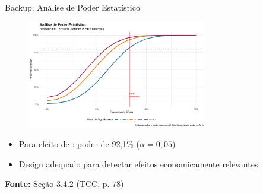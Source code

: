 \documentclass[10pt,aspectratio=169]{beamer}
\begin{document}
\begin{frame}{Backup: Análise de Poder Estatístico}
\begin{figure}
\centering
\includegraphics[width=0.7\textwidth]{../../../data/outputs/additional_figures/power_analysis_simulation.png}
\end{figure}

\begin{itemize}
    \item Para efeito de \mainattpct{}: poder de 92,1\% ($\alpha = 0,05$)
    \item Design adequado para detectar efeitos economicamente relevantes
\end{itemize}

\textbf{Fonte:} Seção 3.4.2 (TCC, p. 78)
\end{frame}
\end{document}
